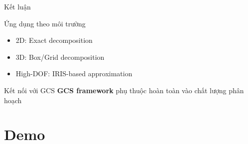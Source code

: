 \documentclass[aspectratio=169]{beamer}
\begin{document}


\begin{frame}{Kết luận}



    \begin{alertblock}{Ứng dụng theo môi trường}
        \begin{itemize}
            \item 2D: Exact decomposition
            \item 3D: Box/Grid decomposition
            \item High-DOF: IRIS-based approximation
        \end{itemize}
    \end{alertblock}

    \begin{block}{Kết nối với GCS}
        \textbf{GCS framework} phụ thuộc hoàn toàn vào chất lượng phân hoạch
    \end{block}

\end{frame}

\section{Demo}

\end{document}

